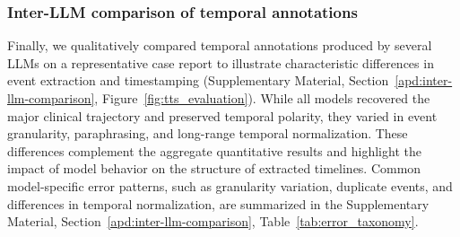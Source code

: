 \documentclass[pdflatex,sn-mathphys-num]{sn-jnl}%
\theoremstyle{thmstyleone}%
\theoremstyle{thmstyletwo}%
\theoremstyle{thmstylethree}%
\begin{document}


\subsubsection{Inter-LLM comparison of temporal annotations}
Finally, we qualitatively compared temporal annotations produced by several LLMs on a representative case report to illustrate characteristic differences in event extraction and timestamping (Supplementary Material, Section~\ref{apd:inter-llm-comparison}, Figure~\ref{fig:tts_evaluation}). While all models recovered the major clinical trajectory and preserved temporal polarity, they varied in
event granularity, paraphrasing, and long-range temporal normalization. These differences complement the aggregate quantitative results and highlight the impact of model behavior on the structure of extracted timelines. Common model-specific error patterns, such as granularity variation, duplicate events, and differences in temporal normalization, are summarized in the Supplementary Material, Section~\ref{apd:inter-llm-comparison}, Table~\ref{tab:error_taxonomy}.
\end{document}
